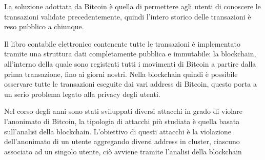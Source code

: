La soluzione adottata da Bitcoin è quella di permettere agli utenti di conoscere le transazioni validate precedentemente, quindi l'intero storico delle transazioni è reso pubblico a chiunque.

Il libro contabile elettronico contenente tutte le transazioni è implementato tramite una struttura dati completamente pubblica e immutabile: la blockchain, all’interno della quale sono registrati tutti i movimenti di Bitcoin a partire dalla prima transazione, fino ai giorni nostri. Nella blockchain quindi è possibile osservare tutte le transazioni eseguite dai vari address di Bitcoin, questo porta a un serio problema legato alla privacy degli utenti. 

Nel corso degli anni sono stati sviluppati diversi attacchi in grado di violare l'anonimato di Bitcoin, la tipologia di attacchi più studiata è quella basata sull'analisi della blockchain. L'obiettivo di questi attacchi è la violazione dell'anonimato di un utente aggregando diversi address in cluster, ciascuno associato ad un singolo utente, ciò avviene tramite l'analisi della blockchain 